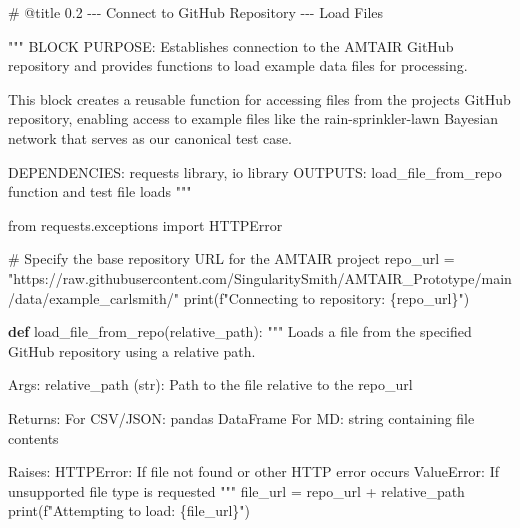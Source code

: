 \documentclass[
  11pt,
  letterpaper,
]{book}
\newenvironment{Shaded}{\begin{snugshade}}{\end{snugshade}}
\newcommand{\BuiltInTok}[1]{\textcolor[rgb]{0.00,0.23,0.31}{#1}}
\newcommand{\CommentTok}[1]{\textcolor[rgb]{0.37,0.37,0.37}{#1}}
\newcommand{\ImportTok}[1]{\textcolor[rgb]{0.00,0.46,0.62}{#1}}
\newcommand{\KeywordTok}[1]{\textcolor[rgb]{0.00,0.23,0.31}{\textbf{#1}}}
\newcommand{\NormalTok}[1]{\textcolor[rgb]{0.00,0.23,0.31}{#1}}
\newcommand{\OperatorTok}[1]{\textcolor[rgb]{0.37,0.37,0.37}{#1}}
\newcommand{\SpecialCharTok}[1]{\textcolor[rgb]{0.37,0.37,0.37}{#1}}
\newcommand{\SpecialStringTok}[1]{\textcolor[rgb]{0.13,0.47,0.30}{#1}}
\newcommand{\StringTok}[1]{\textcolor[rgb]{0.13,0.47,0.30}{#1}}
\begin{document}
\label{my_code_cell_test}
\begin{Shaded}
\begin{Highlighting}[]
\CommentTok{\# @title 0.2 {-}{-}{-} Connect to GitHub Repository {-}{-}{-} Load Files}

\CommentTok{"""}
\CommentTok{BLOCK PURPOSE: Establishes connection to the AMTAIR GitHub repository and provides}
\CommentTok{functions to load example data files for processing.}

\CommentTok{This block creates a reusable function for accessing files from the project\textquotesingle{}s}
\CommentTok{GitHub repository, enabling access to example files like the rain{-}sprinkler{-}lawn}
\CommentTok{Bayesian network that serves as our canonical test case.}

\CommentTok{DEPENDENCIES: requests library, io library}
\CommentTok{OUTPUTS: load\_file\_from\_repo function and test file loads}
\CommentTok{"""}

\ImportTok{from}\NormalTok{ requests.exceptions }\ImportTok{import}\NormalTok{ HTTPError}

\CommentTok{\# Specify the base repository URL for the AMTAIR project}
\NormalTok{repo\_url }\OperatorTok{=} \StringTok{"https://raw.githubusercontent.com/SingularitySmith/AMTAIR\_Prototype/main/data/example\_carlsmith/"}
\BuiltInTok{print}\NormalTok{(}\SpecialStringTok{f"Connecting to repository: }\SpecialCharTok{\{}\NormalTok{repo\_url}\SpecialCharTok{\}}\SpecialStringTok{"}\NormalTok{)}

\KeywordTok{def}\NormalTok{ load\_file\_from\_repo(relative\_path):}
    \CommentTok{"""}
\CommentTok{    Loads a file from the specified GitHub repository using a relative path.}

\CommentTok{    Args:}
\CommentTok{        relative\_path (str): Path to the file relative to the repo\_url}

\CommentTok{    Returns:}
\CommentTok{        For CSV/JSON: pandas DataFrame}
\CommentTok{        For MD: string containing file contents}

\CommentTok{    Raises:}
\CommentTok{        HTTPError: If file not found or other HTTP error occurs}
\CommentTok{        ValueError: If unsupported file type is requested}
\CommentTok{    """}
\NormalTok{    file\_url }\OperatorTok{=}\NormalTok{ repo\_url }\OperatorTok{+}\NormalTok{ relative\_path}
    \BuiltInTok{print}\NormalTok{(}\SpecialStringTok{f"Attempting to load: }\SpecialCharTok{\{}\NormalTok{file\_url}\SpecialCharTok{\}}\SpecialStringTok{"}\NormalTok{)}


\end{Highlighting}
\end{Shaded}
\end{document}
